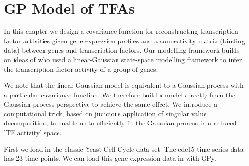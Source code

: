 
\chapter{GP Model of TFAs}\label{ch:GP_Model_of_TFAs}

\ifpdf
    \graphicspath{{Chapter4/Figs/Raster/}{Chapter4/Figs/PDF/}{Chapter4/Figs/}}
\else
    \graphicspath{{Chapter4/Figs/Vector/}{Chapter4/Figs/}}
\fi

In this chapter we design a covariance function for reconstructing transcription factor activities given gene 
expression profiles and a connectivity matrix (binding data) between genes and transcription factors. 
Our modelling framework builds on ideas of \cite{Sanguinetti:2006} 
who used a linear-Gaussian state-space modelling framework to infer the transcription factor activity 
of a group of genes. 

We note that the linear Gaussian model is equivalent to a Gaussian process with a particular covariance function. 
We therefore build a model directly from the Gaussian process perspective to achieve the same effect. 
We introduce a computational trick, based on  judicious application of singular value decomposition, 
to enable us to efficiently fit the Gaussian process in a reduced 'TF activity' space. 




First we load in the classic \cite{Spellman:1998} Yeast Cell Cycle data set. The cdc15 time series data has 
23 time points. We can load this gene expression data in with GPy.

